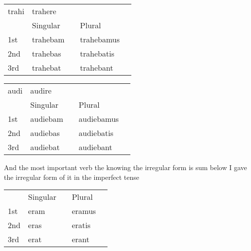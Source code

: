 \begin{center}  
  \begin{tabular}{lllll}
      trahi & trahere & & & \\
          & Singular  &   & Plural & \\
      1st & trahebam  &  & trahebamus &  \\
      2nd & trahebas &  & trahebatis &  \\
      3rd & trahebat &  & trahebant  &  \\
  \end{tabular}
\end{center}

\begin{center}  
  \begin{tabular}{lllll}
      audi&audire & & & \\
      & Singular  &   & Plural & \\
      1st & audiebam  &  & audiebamus &  \\
      2nd & audiebas &  & audiebatis &  \\
      3rd & audiebat &  & audiebant  &  \\
  \end{tabular}
\end{center}
And the most important verb the knowing the irregular form is sum below I gave
the irregular form of it in the imperfect tense 
\begin{center}  
  \begin{tabular}{lllll}
      & Singular  &   & Plural & \\
      1st & eram  &  & eramus &  \\
      2nd & eras &  & eratis &  \\
      3rd & erat &  & erant  &  \\
  \end{tabular}
\end{center}


